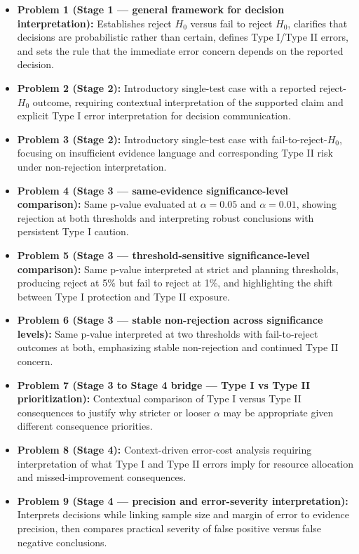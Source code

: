 \begin{itemize}
    \item \textbf{Problem 1 (Stage 1 --- general framework for decision interpretation):} Establishes reject \(H_0\) versus fail to reject \(H_0\), clarifies that decisions are probabilistic rather than certain, defines Type I/Type II errors, and sets the rule that the immediate error concern depends on the reported decision.
    \item \textbf{Problem 2 (Stage 2):} Introductory single-test case with a reported reject-\(H_0\) outcome, requiring contextual interpretation of the supported claim and explicit Type I error interpretation for decision communication.
    \item \textbf{Problem 3 (Stage 2):} Introductory single-test case with fail-to-reject-\(H_0\), focusing on insufficient evidence language and corresponding Type II risk under non-rejection interpretation.
    \item \textbf{Problem 4 (Stage 3 --- same-evidence significance-level comparison):} Same p-value evaluated at \(\alpha=0.05\) and \(\alpha=0.01\), showing rejection at both thresholds and interpreting robust conclusions with persistent Type I caution.
    \item \textbf{Problem 5 (Stage 3 --- threshold-sensitive significance-level comparison):} Same p-value interpreted at strict and planning thresholds, producing reject at 5\% but fail to reject at 1\%, and highlighting the shift between Type I protection and Type II exposure.
    \item \textbf{Problem 6 (Stage 3 --- stable non-rejection across significance levels):} Same p-value interpreted at two thresholds with fail-to-reject outcomes at both, emphasizing stable non-rejection and continued Type II concern.
    \item \textbf{Problem 7 (Stage 3 to Stage 4 bridge --- Type I vs Type II prioritization):} Contextual comparison of Type I versus Type II consequences to justify why stricter or looser \(\alpha\) may be appropriate given different consequence priorities.
    \item \textbf{Problem 8 (Stage 4):} Context-driven error-cost analysis requiring interpretation of what Type I and Type II errors imply for resource allocation and missed-improvement consequences.
    \item \textbf{Problem 9 (Stage 4 --- precision and error-severity interpretation):} Interprets decisions while linking sample size and margin of error to evidence precision, then compares practical severity of false positive versus false negative conclusions.

\end{itemize}
